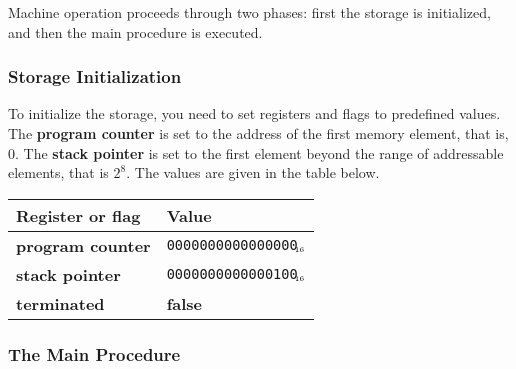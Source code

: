 \documentclass[a4paper,11pt]{article}
\newcommand{\PC}{\textbf{program counter}\xspace}
\newcommand{\SP}{\textbf{stack pointer}\xspace}
\newcommand{\TERM}{\textbf{terminated}\xspace}
\newcommand{\F}{\textbf{false}\xspace}
\newcommand{\num}[1]{\texttt{#1}\xspace}
\newcommand{\hex}[1]{\num{#1}$_{\textup{\tiny\hskip-1ex 16}}$\xspace}
\begin{document}
Machine operation proceeds through two phases: first the storage is initialized, and then the main procedure is executed.

\subsubsection{Storage Initialization}

To initialize the storage, you need to set registers and flags to predefined values.
The \PC is set to the address of the first memory element, that is, $0$.
The \SP is set to the first element beyond the range of addressable elements, that is $2^{8}$.
The values are given in the table below.

\begin{center}
  \begin{tabular}{@{}ll@{}}
    \hline
    Register or flag & Value                   \\
    \hline
    \PC              & \hex{0000000000000000}  \\
    \SP              & \hex{0000000000000100}  \\
    \TERM            & \F                      \\
    \hline
  \end{tabular}
\end{center}

\subsubsection{The Main Procedure}
\end{document}
